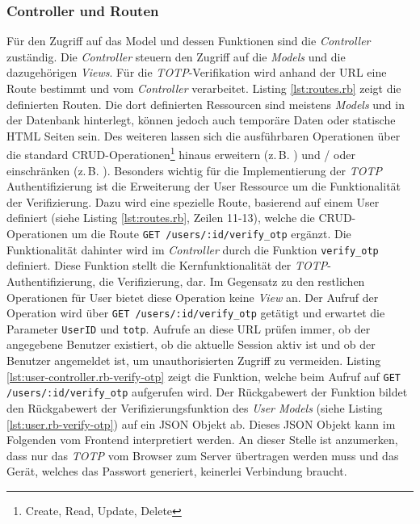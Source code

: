 \documentclass[11pt,a4paper,ngerman]{scrreprt}
\begin{document}
\subsubsection{Controller und Routen}
Für den Zugriff auf das Model und dessen Funktionen sind die \textit{Controller} zuständig. Die \textit{Controller} steuern den Zugriff auf die \textit{Models} und die dazugehörigen \textit{Views}. Für die \textit{TOTP}-Verifikation wird anhand der URL eine Route bestimmt und vom \textit{Controller} verarbeitet. Listing \ref{lst:routes.rb} zeigt die definierten Routen. Die dort definierten Ressourcen sind meistens \textit{Models} und in der Datenbank hinterlegt, können jedoch auch temporäre Daten oder statische HTML Seiten sein. Des weiteren lassen sich die ausführbaren Operationen über die standard CRUD-Operationen\footnote{Create, Read, Update, Delete} hinaus erweitern (z.\,B. ) und / oder einschränken (z.\,B. ). Besonders wichtig für die Implementierung der \textit{TOTP} Authentifizierung ist die Erweiterung der User Ressource um die Funktionalität der Verifizierung. Dazu wird eine spezielle Route, basierend auf einem User definiert (siehe Listing \ref{lst:routes.rb}, Zeilen 11-13), welche die CRUD-Operationen um die Route \texttt{GET /users/:id/verify\_otp} ergänzt. Die Funktionalität dahinter wird im \textit{Controller} durch die Funktion \texttt{verify\_otp} definiert. Diese Funktion stellt die Kernfunktionalität der \textit{TOTP}-Authentifizierung, die Verifizierung, dar. Im Gegensatz zu den restlichen Operationen für User bietet diese Operation keine \textit{View} an. Der Aufruf der Operation wird über \texttt{GET /users/:id/verify\_otp} getätigt und erwartet die Parameter \texttt{UserID} und \texttt{totp}. Aufrufe an diese URL prüfen immer, ob der angegebene Benutzer existiert, ob die aktuelle Session aktiv ist und ob der Benutzer angemeldet ist, um unauthorisierten Zugriff zu vermeiden. Listing \ref{lst:user-controller.rb-verify-otp} zeigt die Funktion, welche beim Aufruf auf \texttt{GET /users/:id/verify\_otp} aufgerufen wird. Der Rückgabewert der Funktion bildet den Rückgabewert der Verifizierungsfunktion des \textit{User Models} (siehe Listing \ref{lst:user.rb-verify-otp}) auf ein JSON Objekt ab. Dieses JSON Objekt kann im Folgenden vom Frontend interpretiert werden. An dieser Stelle ist anzumerken, dass nur das \textit{TOTP} vom Browser zum Server übertragen werden muss und das Gerät, welches das Passwort generiert, keinerlei Verbindung braucht.
\end{document}
